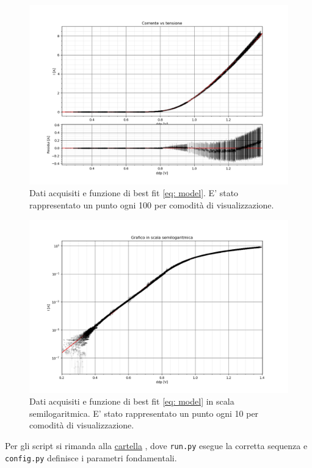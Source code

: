 \documentclass{article}[a4paper, oneside, 11pt]
\begin{document}
\begin{figure}[H]
	\centering 
 		\includegraphics[scale=0.5]{./Figure_4_1_Nskip_100.png}
	\caption{Dati acquisiti e funzione di best fit \eqref{eq: model}. E' 
	stato rappresentato un punto ogni 100 per comodità di visualizzazione.
	\label{fig: sck_lin}}
\end{figure}


\begin{figure}[H]
	\centering 
 		\includegraphics[scale=0.6]{./Figure_3_1_Nskip_10.png}
	\caption{Dati acquisiti e funzione di best fit \eqref{eq: model} in 
	scala semilogaritmica. E' stato rappresentato un punto ogni 10 per comodità di 
	visualizzazione. \label{fig: sck_log}}
\end{figure}

Per gli script si rimanda alla 
\href{https://github.com/LucaCiucci/relaz_seme/tree/master/Cartella_fit}{cartella}
, dove \verb+run.py+ esegue la corretta sequenza e \verb+config.py+ definisce 
i parametri fondamentali.
\end{document}
